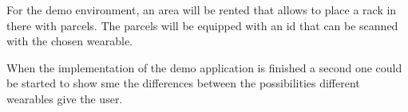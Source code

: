For the demo environment, an area will be rented that allows to place a rack in there with \gls{parcel}s. The \gls{parcel}s will be equipped with an \gls{id} that can be scanned with the chosen wearable.

When the implementation of the demo application is finished a second one could be started to show \gls{sme} the differences between the possibilities different wearables give the user.
